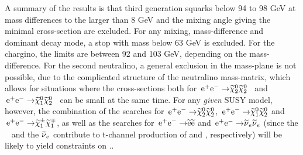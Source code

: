 A summary of the results is that 
third generation squarks below 94 to 98 GeV at
mass differences to the   larger than 8 GeV 
and the mixing angle giving the
minimal cross-section are excluded. 
For any mixing, mass-difference and dominant
decay mode, 
a stop with mass below 63 GeV is excluded.
For the chargino,
the limits are between 92 and 103 GeV, 
depending on the mass-difference.
For the second neutralino,
a general exclusion in the mass-plane is not possible,
due to the complicated structure of the neutralino mass-matrix,
which allows for situations where the cross-sections both for
$\eeto \XN{2} \XN{2}$~ and $\eeto \XN{1} \XN{2}$~ can be small
at the same time. 
For any {\it given} SUSY model, however, the combination of the
searches for $\eeto \XN{2} \XN{2}$, $\eeto \XN{1} \XN{2}$ and
$\eeto  \XPM{1} \XMP{1}$, 
as well as the searches for $\eeto \sel \sel$ and $\eeto \snu_e \snu_e$ 
(since the \sel~ and the $\snu_e$ contribute to t-channel production of  and , 
respectively) 
will be likely to yield constraints on ..
